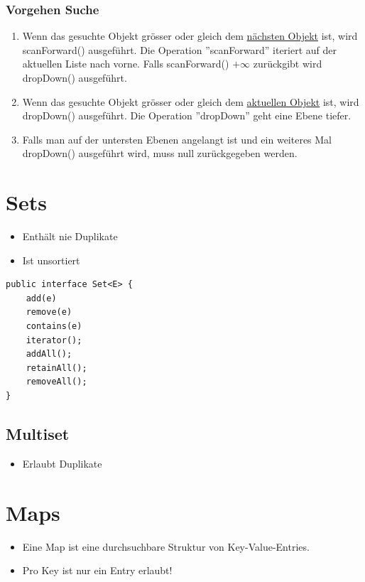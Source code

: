 \subsubsection{Vorgehen Suche}
\begin{enumerate}
	\item Wenn das gesuchte Objekt grösser oder gleich dem \underline{nächsten Objekt} ist, wird scanForward() ausgeführt. Die Operation ''scanForward'' iteriert auf der aktuellen Liste nach vorne. Falls scanForward() $+\infty$ zurückgibt wird dropDown() ausgeführt.
	\item Wenn das gesuchte Objekt grösser oder gleich dem \underline{aktuellen Objekt} ist, wird dropDown() ausgeführt. Die Operation ''dropDown'' geht eine Ebene tiefer.
	\item Falls man auf der untersten Ebenen angelangt ist und ein weiteres Mal dropDown() ausgeführt wird, muss null zurückgegeben werden.
\end{enumerate}

\section{Sets}
\begin{itemize}
	\item Enthält nie Duplikate
	\item Ist unsortiert
\end{itemize}

\begin{lstlisting}
public interface Set<E> {
	add(e)
	remove(e)
	contains(e)
	iterator();
	addAll();
	retainAll();
	removeAll();
}
\end{lstlisting}

\subsection{Multiset}
\begin{itemize}
	\item Erlaubt Duplikate
\end{itemize}

\section{Maps}
\begin{itemize}
	\item Eine Map ist eine durchsuchbare Struktur von Key-Value-Entries.
	\item Pro Key ist nur ein Entry erlaubt!
\end{itemize}


